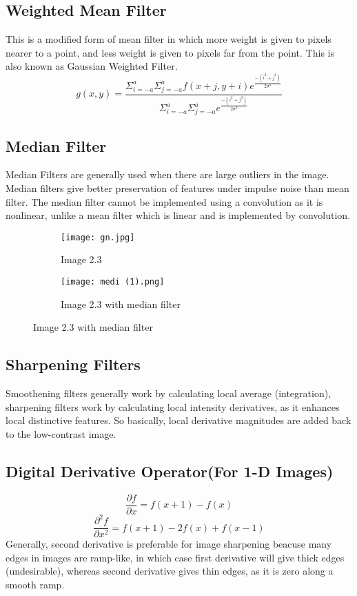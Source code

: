 \documentclass{report}
\begin{document}
\subsection{Weighted Mean Filter}
This is a modified form of mean filter in which more weight is given to pixels nearer to a point, and less weight is given to pixels far from the point. This is also known as Gaussian Weighted Filter.
\[g(x,y) = \frac{\Sigma_{i=-a}^{a}\Sigma_{j=-a}^{a}f(x+j, y+i)e^{\frac{-(i^2+j^2)}{2\sigma^2}}}{\Sigma_{i=-a}^{a}\Sigma_{j=-a}^{a}e^{\frac{-(i^2+j^2)}{2\sigma^2}}}\]
\subsection{Median Filter}
Median Filters are generally used when there are large outliers in the image. Median filters give better preservation of features under impulse noise than mean filter.
The median filter cannot be implemented using a convolution as it is nonlinear, unlike a mean filter which is linear and is implemented by convolution.
\begin{figure}[h]
    \begin{subfigure}{0.4\textwidth}
    \centering
    \texttt{[image: gn.jpg]}
    \caption{Image 2.3}
    \end{subfigure}
    \begin{subfigure}{0.4\textwidth}
    \centering
    \texttt{[image: medi (1).png]}
    \caption{Image 2.3 with median filter}
    \end{subfigure}
\end{figure}
\subsection{Sharpening Filters}
Smoothening filters generally work by calculating local average (integration), sharpening filters work by calculating local intensity derivatives, as it enhances local distinctive features. So basically, local derivative magnitudes are added back to the low-contrast image.
\subsection{Digital Derivative Operator(For 1-D Images)}
\[\frac{\partial f}{\partial x} = f(x+1) - f(x) \]
\[\frac{{\partial}^2 f}{\partial x^2} = f(x+1) - 2f(x) + f(x-1) \]
Generally, second derivative is preferable for image sharpening beacuse many edges in images are ramp-like, in which case first derivative will give thick edges (undesirable), whereas second derivative gives thin edges, as it is zero along a smooth ramp.
\end{document}
